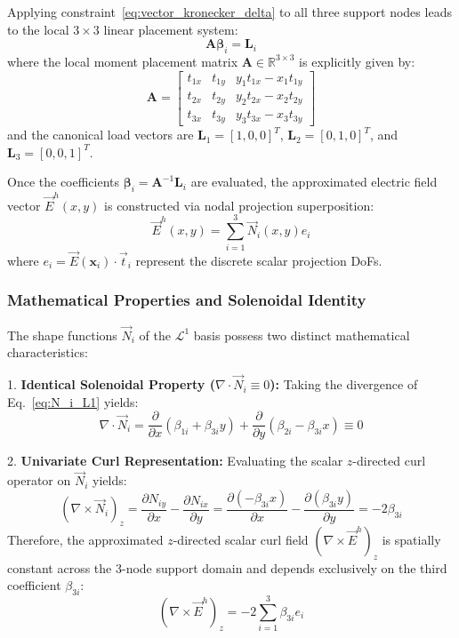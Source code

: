 \documentclass[preprint,12pt]{elsarticle}
\begin{document}
Applying constraint~\eqref{eq:vector_kronecker_delta} to all three support nodes leads to the local $3 \times 3$ linear placement system: 
\begin{equation}
\mathbf{A} \boldsymbol{\beta}_i = \mathbf{L}_i
\label{eq:linear_placement_system}
\end{equation}
where the local moment placement matrix $\mathbf{A} \in \mathbb{R}^{3 \times 3}$ is explicitly given by:
\begin{equation}
\mathbf{A} = \begin{bmatrix}
t_{1x} & t_{1y} & y_1 t_{1x} - x_1 t_{1y} \\
t_{2x} & t_{2y} & y_2 t_{2x} - x_2 t_{2y} \\
t_{3x} & t_{3y} & y_3 t_{3x} - x_3 t_{3y}
\end{bmatrix}
\label{eq:matrix_A_L1}
\end{equation}
and the canonical load vectors are $\mathbf{L}_1 = [1, 0, 0]^T$, $\mathbf{L}_2 = [0,1,0]^T$, and $\mathbf{L}_3 = [0,0,1]^T$.

Once the coefficients $\boldsymbol{\beta}_i = \mathbf{A}^{-1} \mathbf{L}_i$ are evaluated, the approximated electric field vector $\vec{E}^h(x, y)$ is constructed via nodal projection superposition:
\begin{equation}
\vec{E}^h(x, y) = \sum_{i=1}^3 \vec{N}_i(x, y) e_i
\end{equation}
where $e_i = \vec{E}(\mathbf{x}_i) \cdot \vec{t}_i$ represent the discrete scalar projection DoFs.

\subsubsection{Mathematical Properties and Solenoidal Identity}
The shape functions $\vec{N}_i$ of the $\mathcal{L}^1$ basis possess two distinct mathematical characteristics:

1. \textbf{Identical Solenoidal Property ($\nabla \cdot \vec{N}_i \equiv 0$):} Taking the divergence of Eq.~\eqref{eq:N_i_L1} yields:
\begin{equation}
\nabla \cdot \vec{N}_i = \frac{\partial}{\partial x}(\beta_{1i} + \beta_{3i} y) + \frac{\partial}{\partial y}(\beta_{2i} - \beta_{3i} x) \equiv 0
\end{equation}

2. \textbf{Univariate Curl Representation:} Evaluating the scalar $z$-directed curl operator on $\vec{N}_i$ yields:
\begin{equation}
(\nabla \times \vec{N}_i)_z = \frac{\partial N_{iy}}{\partial x} - \frac{\partial N_{ix}}{\partial y} = \frac{\partial (-\beta_{3i} x)}{\partial x} - \frac{\partial (\beta_{3i} y)}{\partial y} = -2\beta_{3i}
\end{equation}
Therefore, the approximated $z$-directed scalar curl field $(\nabla \times \vec{E}^h)_z$ is spatially constant across the 3-node support domain and depends exclusively on the third coefficient $\beta_{3i}$:
\begin{equation}
(\nabla \times \vec{E}^h)_z = -2 \sum_{i=1}^3 \beta_{3i} e_i
\end{equation}
\end{document}
